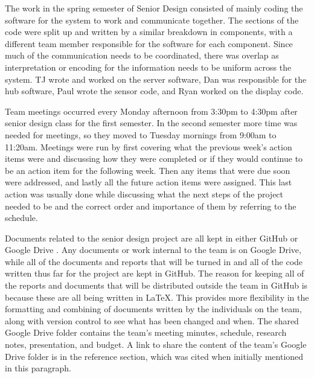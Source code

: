 \documentclass[PPFS.tex]{template/subfiles}
\begin{document}
	The work in the spring semester of Senior Design consisted of mainly coding the software for the system to work and communicate together. The sections of the code were split up and written by a similar breakdown in components, with a different team member responsible for the software for each component. Since much of the communication needs to be coordinated, there was overlap as interpretation or encoding for the information needs to be uniform across the system. TJ wrote and worked on the server software, Dan was responsible for the hub software, Paul wrote the sensor code, and Ryan worked on the display code.

	Team meetings occurred every Monday afternoon from 3:30pm to 4:30pm after senior design class for the first semester. In the second semester more time was needed for meetings, so they moved to Tuesday mornings from 9:00am to 11:20am. Meetings were run by first covering what the previous week's action items were and discussing how they were completed or if they would continue to be an action item for the following week. Then any items that were due soon were addressed, and lastly all the future action items were assigned. This last action was usually done while discussing what the next steps of the project needed to be and the correct order and importance of them by referring to the schedule.

	Documents related to the senior design project are all kept in either GitHub or Google Drive \cite{Google Drive}. Any documents or work internal to the team is on Google Drive, while all of the documents and reports that will be turned in and all of the code written thus far for the project are kept in GitHub. The reason for keeping all of the reports and documents that will be distributed outside the team in GitHub is because these are all being written in \LaTeX. This provides more flexibility in the formatting and combining of documents written by the individuals on the team, along with version control to see what has been changed and when. The shared Google Drive folder contains the team's meeting minutes, schedule, research notes, presentation, and budget. A link to share the content of the team's Google Drive folder is in the reference section, which was cited when initially mentioned in this paragraph.
	
\end{document}
